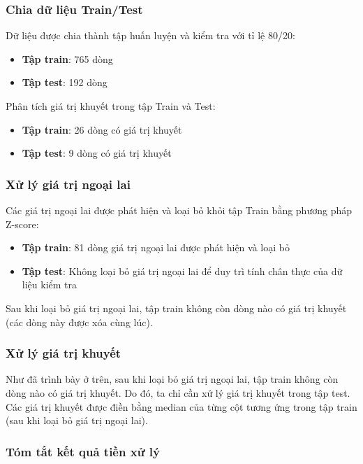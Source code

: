 \documentclass[12pt,a4paper]{article}
\begin{document}
\subsubsection{Chia dữ liệu Train/Test}

Dữ liệu được chia thành tập huấn luyện và kiểm tra với tỉ lệ 80/20:
\begin{itemize}
    \item \textbf{Tập train}: 765 dòng
    \item \textbf{Tập test}: 192 dòng
\end{itemize}

\noindent Phân tích giá trị khuyết trong tập Train và Test:
\begin{itemize}
    \item \textbf{Tập train}: 26 dòng có giá trị khuyết
    \item \textbf{Tập test}: 9 dòng có giá trị khuyết
    
\end{itemize}

\subsubsection{Xử lý giá trị ngoại lai}

Các giá trị ngoại lai được phát hiện và loại bỏ khỏi tập Train bằng phương pháp Z-score:
\begin{itemize}
    \item \textbf{Tập train}: 81 dòng giá trị ngoại lai được phát hiện và loại bỏ
    \item \textbf{Tập test}: Không loại bỏ giá trị ngoại lai để duy trì tính chân thực của dữ liệu kiểm tra
    
\end{itemize}
Sau khi loại bỏ giá trị ngoại lai, tập train không còn dòng nào có giá trị khuyết (các dòng này được xóa cùng lúc).
\subsubsection{Xử lý giá trị khuyết}
Như đã trình bày ở trên, sau khi loại bỏ giá trị ngoại lai, tập train không còn dòng nào có giá trị khuyết. Do đó, ta chỉ cần xử lý giá trị khuyết trong tập test. Các giá trị khuyết được điền bằng median của từng cột tương ứng trong tập train (sau khi loại bỏ giá trị ngoại lai).

\subsubsection{Tóm tắt kết quả tiền xử lý}
\end{document}
